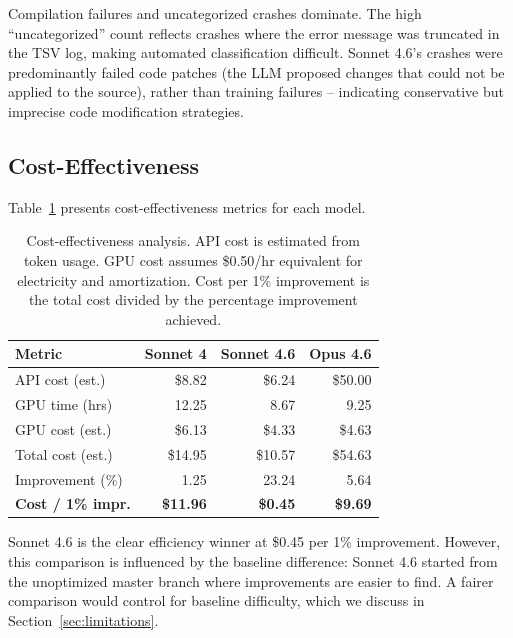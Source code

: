 \documentclass[11pt]{article}
\begin{document}
Compilation failures and uncategorized crashes dominate. The high ``uncategorized'' count reflects crashes where the error message was truncated in the TSV log, making automated classification difficult. Sonnet 4.6's crashes were predominantly failed code patches (the LLM proposed changes that could not be applied to the source), rather than training failures -- indicating conservative but imprecise code modification strategies.

\subsection{Cost-Effectiveness}
\label{sec:cost}

Table~\ref{tab:cost} presents cost-effectiveness metrics for each model.

\begin{table}[H]
\centering
\caption{Cost-effectiveness analysis. API cost is estimated from token usage. GPU cost assumes \$0.50/hr equivalent for electricity and amortization. Cost per 1\% improvement is the total cost divided by the percentage improvement achieved.}
\label{tab:cost}
\begin{tabular}{lrrr}
\toprule
\textbf{Metric} & \textbf{Sonnet 4} & \textbf{Sonnet 4.6} & \textbf{Opus 4.6} \\
\midrule
API cost (est.)      & \$8.82  & \$6.24  & \$50.00  \\
GPU time (hrs)       & 12.25   & 8.67    & 9.25     \\
GPU cost (est.)      & \$6.13  & \$4.33  & \$4.63   \\
Total cost (est.)    & \$14.95 & \$10.57 & \$54.63  \\
Improvement (\%)     & 1.25    & 23.24   & 5.64     \\
\textbf{Cost / 1\% impr.} & \textbf{\$11.96} & \textbf{\$0.45}  & \textbf{\$9.69}  \\
\bottomrule
\end{tabular}
\end{table}

Sonnet 4.6 is the clear efficiency winner at \$0.45 per 1\% improvement. However, this comparison is influenced by the baseline difference: Sonnet 4.6 started from the unoptimized master branch where improvements are easier to find. A fairer comparison would control for baseline difficulty, which we discuss in Section~\ref{sec:limitations}.
\end{document}
